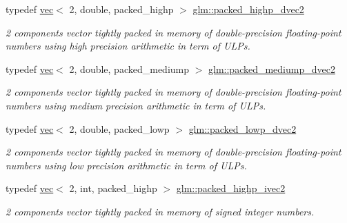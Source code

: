 \begin{DoxyCompactItemize}
typedef \hyperlink{structglm_1_1vec}{vec}$<$ 2, double, packed\+\_\+highp $>$ \hyperlink{group__gtc__type__aligned_ga8c26414d99b8996aa7dc73e1dc8a06bd}{glm\+::packed\+\_\+highp\+\_\+dvec2}
\begin{DoxyCompactList}\small\item\em 2 components vector tightly packed in memory of double-\/precision floating-\/point numbers using high precision arithmetic in term of U\+L\+Ps. \end{DoxyCompactList}\item 
\mbox{\label{group__gtc__type__aligned_ga5cbf23f43f82491a631c35ca8664ae0b}} 
typedef \hyperlink{structglm_1_1vec}{vec}$<$ 2, double, packed\+\_\+mediump $>$ \hyperlink{group__gtc__type__aligned_ga5cbf23f43f82491a631c35ca8664ae0b}{glm\+::packed\+\_\+mediump\+\_\+dvec2}
\begin{DoxyCompactList}\small\item\em 2 components vector tightly packed in memory of double-\/precision floating-\/point numbers using medium precision arithmetic in term of U\+L\+Ps. \end{DoxyCompactList}\item 
\mbox{\label{group__gtc__type__aligned_gae61fd7d54de0db35af2b3b7fde2971f2}} 
typedef \hyperlink{structglm_1_1vec}{vec}$<$ 2, double, packed\+\_\+lowp $>$ \hyperlink{group__gtc__type__aligned_gae61fd7d54de0db35af2b3b7fde2971f2}{glm\+::packed\+\_\+lowp\+\_\+dvec2}
\begin{DoxyCompactList}\small\item\em 2 components vector tightly packed in memory of double-\/precision floating-\/point numbers using low precision arithmetic in term of U\+L\+Ps. \end{DoxyCompactList}\item 
\mbox{\label{group__gtc__type__aligned_gae362d70a8be88cc43b6c1ec0992e73db}} 
typedef \hyperlink{structglm_1_1vec}{vec}$<$ 2, int, packed\+\_\+highp $>$ \hyperlink{group__gtc__type__aligned_gae362d70a8be88cc43b6c1ec0992e73db}{glm\+::packed\+\_\+highp\+\_\+ivec2}
\begin{DoxyCompactList}\small\item\em 2 components vector tightly packed in memory of signed integer numbers. \end{DoxyCompactList}\item 

\end{DoxyCompactItemize}
